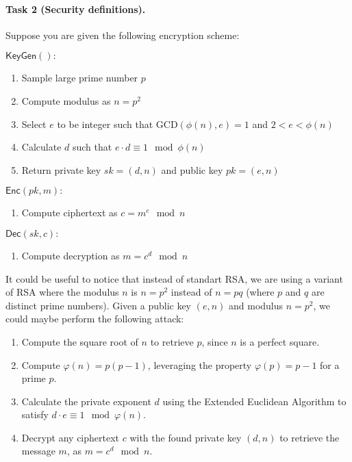 \documentclass{article}
\begin{document}
\paragraph{Task 2 (Security definitions).} Suppose you are given the following encryption scheme:
\begin{tcolorbox}[colback=white]
\begin{multicols}{2}
$\mathsf{KeyGen}():$
\begin{enumerate}
    \item Sample large prime number $p$ 
    \item Compute modulus as $n = p^2$
    \item Select $e$ to be integer such that $\text{GCD}(\phi(n), e) = 1$ and $2 < e < \phi(n)$
    \item Calculate $d$ such that $e \cdot d \equiv 1 \mod \phi(n)$
    \item Return private key  $sk = (d,n)$ and public key $pk = (e,n)$
\end{enumerate}

\columnbreak
$\mathsf{Enc}(pk,m):$
\begin{enumerate}
    \item Compute ciphertext as $c = m^e \mod n$ 
\end{enumerate}

$\mathsf{Dec}(sk,c):$
\begin{enumerate}
    \item Compute decryption as $m = c^d \mod n$
\end{enumerate}
\end{multicols}
\end{tcolorbox}

It could be useful to notice that instead of standart RSA, we are using a variant of RSA where the modulus $n$ is $n = p^2$ instead of $n = pq$ (where $p$ and $q$ are distinct prime numbers).
Given a public key \( (e, n) \) and modulus \( n = p^2 \), we could maybe perform the following attack:

\begin{enumerate}
    \item Compute the square root of \( n \) to retrieve \( p \), since \( n \) is a perfect square.
    \item Compute \( \varphi(n) = p(p-1) \), leveraging the property \( \varphi(p) = p-1 \) for a prime \( p \).
    \item Calculate the private exponent \( d \) using the Extended Euclidean Algorithm to satisfy \( d \cdot e \equiv 1 \mod \varphi(n) \).
    \item Decrypt any ciphertext \( c \) with the found private key \( (d, n) \) to retrieve the message \( m \), as \( m = c^d \mod n \).
\end{enumerate}
\end{document}
